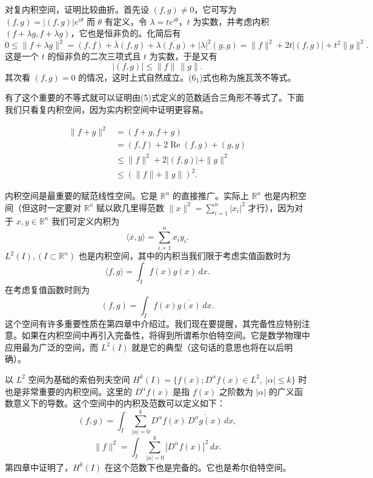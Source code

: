 对复内积空间，证明比较曲折。首先设 $(f,g)\ne0$，它可写为 $(f,g)=|(f,g)|e^{i\theta}$ 而 $\theta$ 有定义，令 $\lambda=te^{i\theta}$，$t$ 为实数，并考虑内积 $(f+\lambda g,f+\lambda g)$，它也是恒非负的。化简后有
\[
 0\le \|f+\lambda g\|^2=(f,f)+\overline\lambda(f,g)+\lambda\overline{(f,g)}+|\lambda|^2(g,g)
 =\|f\|^2+2t|(f,g)|+t^2\|g\|^2.
\]
这是一个 $t$ 的恒非负的二次三项式且 $t$ 为实数，于是又有
\begin{equation}
 |(f,g)|\le \|f\|\,\|g\|.
 \tag{6$_1$}
\end{equation}
其次看 $(f,g)=0$ 的情况，这时上式自然成立。(6$_1$)式也称为施瓦茨不等式。

有了这个重要的不等式就可以证明由(5)式定义的范数适合三角形不等式了。下面我们只看复内积空间，因为实内积空间中证明更容易。

\[
\begin{aligned}
 \|f+g\|^2
 &=(f+g,f+g)\\
 &=(f,f)+2\operatorname{Re}(f,g)+(g,g)\\
 &\le \|f\|^2+2|(f,g)|+\|g\|^2\\
 &\le (\|f\|+\|g\|)^2.
\end{aligned}
\]

内积空间是最重要的赋范线性空间。它是 $\mathbb R^n$ 的直接推广。实际上 $\mathbb R^n$ 也是内积空间（但这时一定要对 $\mathbb R^n$ 赋以欧几里得范数 $\|x\|^2=\sum_{i=1}^n|x_i|^2$ 才行），因为对于 $x,y\in\mathbb R^n$ 我们可定义内积为
\[
 \langle x,y\rangle=\sum_{i=1}^n x_i y_i.
\]
$L^2(I),(I\subset\mathbb R^n)$ 也是内积空间，其中的内积当我们限于考虑实值函数时为
\[
 \langle f,g\rangle=\int_I f(x)g(x)\,dx.
\]
在考虑复值函数时则为
\[
 (f,g)=\int_I f(x)\overline{g(x)}\,dx.
\]
这个空间有许多重要性质在第四章中介绍过。我们现在要提醒，其完备性应特别注意。如果在内积空间中再引入完备性，将得到所谓希尔伯特空间。它是数学物理中应用最为广泛的空间，而 $L^2(I)$ 就是它的典型（这句话的意思也将在以后明确）。

以 $L^2$ 空间为基础的索伯列夫空间 $H^k(I)=\{f(x);D^\alpha f(x)\in L^2,\ |\alpha|\le k\}$ 时也是非常重要的内积空间。这里的 $D^\alpha f(x)$ 是指 $f(x)$ 之阶数为 $|\alpha|$ 的广义函数意义下的导数。这个空间中的内积及范数可以定义如下：
\[
 (f,g)=\int_I\sum_{|\alpha|=0}^k D^\alpha f(x)\,\overline{D^\alpha g(x)}\,dx,
\]
\[
 \|f\|^2=\int_I\sum_{|\alpha|=0}^k|D^\alpha f(x)|^2\,dx.
\]
第四章中证明了，$H^k(I)$ 在这个范数下也是完备的。它也是希尔伯特空间。

